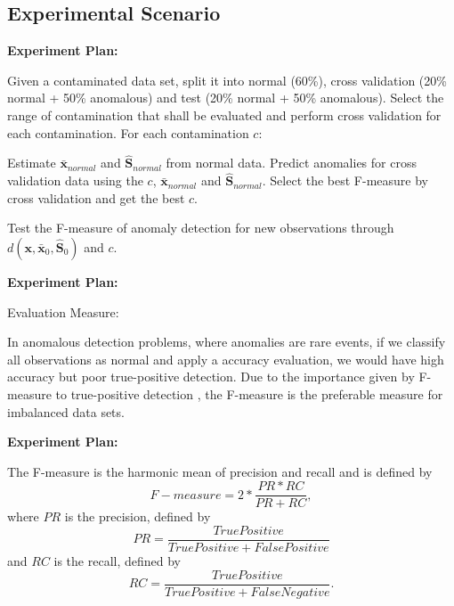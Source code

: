 \documentclass[review]{elsarticle}
\begin{document}
\subsection{Experimental Scenario}
\label{sec:AnalyzedScenario}

\textbf{Experiment Plan:}

	Given a contaminated data set, split it into normal (60\%), cross validation (20\% normal + 50\% anomalous) and test (20\% normal + 50\% anomalous).
	Select the range of contamination that shall be evaluated and perform cross validation for each contamination. 
	For each contamination $c$:
	
		Estimate $\boldsymbol{\bar{x}}_{normal}$ and $\boldsymbol{\hat{S}}_{normal}$ from normal data.
		Predict anomalies for cross validation data using the $c$, $\boldsymbol{\bar{x}}_{normal}$ and $\boldsymbol{\hat{S}}_{normal}$.
		Select the best F-measure by cross validation and get the best $c$.
	
	Test the F-measure of anomaly detection for new observations through $d(\boldsymbol{x},\bar{\boldsymbol{x}}_0, \boldsymbol{\hat{S}}_0)$ and $c$.


\textbf{Experiment Plan:}

    Evaluation Measure:
	
		In anomalous detection problems, where anomalies are rare events, if we classify all observations as normal and apply a accuracy evaluation, we would have high accuracy but poor true-positive detection.
		Due to the importance given by F-measure to true-positive detection \cite{moustafa2019holistic}, the F-measure is the preferable measure for imbalanced data sets.
	


\textbf{Experiment Plan:}

	The F-measure is the harmonic mean of precision and recall and is defined by 
	\begin{equation}\label{eq:eq10}
		F-measure = 2 * \frac{PR * RC}{PR + RC},				
	\end{equation}
	where $PR$ is the precision, defined by 
	\begin{equation}\label{eq:eq11}
		PR = \frac{True Positive}{True Positive + False Positive}
	\end{equation}
	and $RC$ is the recall, defined by 
	\begin{equation}\label{eq:eq12}
		RC = \frac{True Positive}{True Positive + False Negative}.
	\end{equation}
\end{document}

